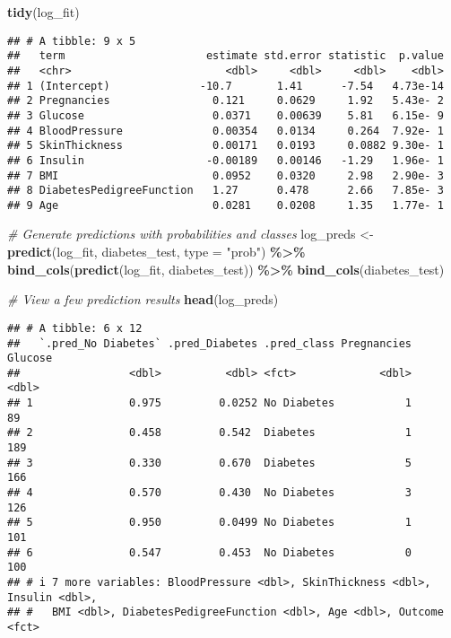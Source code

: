 \documentclass[
]{article}
\newenvironment{Shaded}{\begin{snugshade}}{\end{snugshade}}
\newcommand{\AttributeTok}[1]{\textcolor[rgb]{0.13,0.29,0.53}{#1}}
\newcommand{\CommentTok}[1]{\textcolor[rgb]{0.56,0.35,0.01}{\textit{#1}}}
\newcommand{\FunctionTok}[1]{\textcolor[rgb]{0.13,0.29,0.53}{\textbf{#1}}}
\newcommand{\NormalTok}[1]{#1}
\newcommand{\OtherTok}[1]{\textcolor[rgb]{0.56,0.35,0.01}{#1}}
\newcommand{\SpecialCharTok}[1]{\textcolor[rgb]{0.81,0.36,0.00}{\textbf{#1}}}
\newcommand{\StringTok}[1]{\textcolor[rgb]{0.31,0.60,0.02}{#1}}
\begin{document}
\begin{Shaded}
\begin{Highlighting}[]
\FunctionTok{tidy}\NormalTok{(log\_fit)}
\end{Highlighting}
\end{Shaded}

\begin{verbatim}
## # A tibble: 9 x 5
##   term                      estimate std.error statistic  p.value
##   <chr>                        <dbl>     <dbl>     <dbl>    <dbl>
## 1 (Intercept)              -10.7       1.41      -7.54   4.73e-14
## 2 Pregnancies                0.121     0.0629     1.92   5.43e- 2
## 3 Glucose                    0.0371    0.00639    5.81   6.15e- 9
## 4 BloodPressure              0.00354   0.0134     0.264  7.92e- 1
## 5 SkinThickness              0.00171   0.0193     0.0882 9.30e- 1
## 6 Insulin                   -0.00189   0.00146   -1.29   1.96e- 1
## 7 BMI                        0.0952    0.0320     2.98   2.90e- 3
## 8 DiabetesPedigreeFunction   1.27      0.478      2.66   7.85e- 3
## 9 Age                        0.0281    0.0208     1.35   1.77e- 1
\end{verbatim}

\begin{Shaded}
\begin{Highlighting}[]
\CommentTok{\# Generate predictions with probabilities and classes}
\NormalTok{log\_preds }\OtherTok{\textless{}{-}} \FunctionTok{predict}\NormalTok{(log\_fit, diabetes\_test, }\AttributeTok{type =} \StringTok{"prob"}\NormalTok{) }\SpecialCharTok{\%\textgreater{}\%}
  \FunctionTok{bind\_cols}\NormalTok{(}\FunctionTok{predict}\NormalTok{(log\_fit, diabetes\_test)) }\SpecialCharTok{\%\textgreater{}\%}
  \FunctionTok{bind\_cols}\NormalTok{(diabetes\_test)}

\CommentTok{\# View a few prediction results}
\FunctionTok{head}\NormalTok{(log\_preds)}
\end{Highlighting}
\end{Shaded}

\begin{verbatim}
## # A tibble: 6 x 12
##   `.pred_No Diabetes` .pred_Diabetes .pred_class Pregnancies Glucose
##                 <dbl>          <dbl> <fct>             <dbl>   <dbl>
## 1               0.975         0.0252 No Diabetes           1      89
## 2               0.458         0.542  Diabetes              1     189
## 3               0.330         0.670  Diabetes              5     166
## 4               0.570         0.430  No Diabetes           3     126
## 5               0.950         0.0499 No Diabetes           1     101
## 6               0.547         0.453  No Diabetes           0     100
## # i 7 more variables: BloodPressure <dbl>, SkinThickness <dbl>, Insulin <dbl>,
## #   BMI <dbl>, DiabetesPedigreeFunction <dbl>, Age <dbl>, Outcome <fct>
\end{verbatim}
\end{document}
